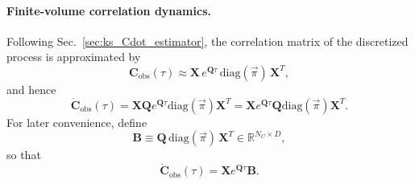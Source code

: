 \documentclass[%
  prl,
  reprint,
  amsmath,
  amssymb,
  aps
]{revtex4-2}
\newcommand{\vvec}[1]{\vec{#1}}
\begin{document}
\paragraph{Finite-volume correlation dynamics.}
Following Sec.~\ref{sec:ks_Cdot_estimator}, the correlation matrix of the discretized process is approximated by
\begin{equation}
    \bm{C}_{\mathrm{obs}}(\tau)
    \approx
    \bm{X}\,e^{\bm{Q}\tau}\,\mathrm{diag}(\vvec{\pi})\,\bm{X}^T,
\end{equation}
and hence
\begin{equation}
    \dot{\bm{C}}_{\mathrm{obs}}(\tau)
    =
    \bm{X}\bm{Q}e^{\bm{Q}\tau}\mathrm{diag}(\vvec{\pi})\bm{X}^T
    =
    \bm{X}e^{\bm{Q}\tau}\bm{Q}\mathrm{diag}(\vvec{\pi})\bm{X}^T.
\label{eq:Cdot_obs_discrete}
\end{equation}
For later convenience, define
\begin{equation}
    \bm{B}
    \equiv
    \bm{Q}\,\mathrm{diag}(\vvec{\pi})\,\bm{X}^T
    \in \mathbb{R}^{N_C\times D},
\label{eq:appendix_B_def}
\end{equation}
so that
\begin{equation}
    \dot{\bm{C}}_{\mathrm{obs}}(\tau)
    =
    \bm{X}e^{\bm{Q}\tau}\bm{B}.
\label{eq:appendix_Cdot_obs_B}
\end{equation}
\end{document}

